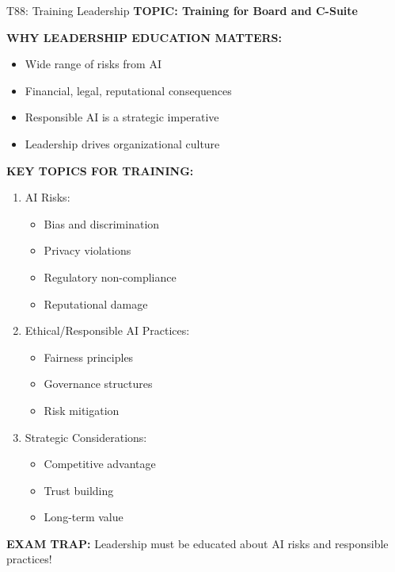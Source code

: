 \documentclass[8pt]{beamer}
\begin{document}
	\begin{frame}{T88: Training Leadership}
		\fontsize{6.5}{7.5}\selectfont
		\textbf{TOPIC: Training for Board and C-Suite}
		
		\vspace{0.1cm}
		\textbf{WHY LEADERSHIP EDUCATION MATTERS:}
		\begin{itemize}
			\item Wide range of risks from AI
			\item Financial, legal, reputational consequences
			\item Responsible AI is a strategic imperative
			\item Leadership drives organizational culture
		\end{itemize}
		
		\vspace{0.1cm}
		\textbf{KEY TOPICS FOR TRAINING:}
		\begin{enumerate}
			\item \textcolor{myblue}{AI Risks:}
			\begin{itemize}
				\item Bias and discrimination
				\item Privacy violations
				\item Regulatory non-compliance
				\item Reputational damage
			\end{itemize}
			\item \textcolor{myblue}{Ethical/Responsible AI Practices:}
			\begin{itemize}
				\item Fairness principles
				\item Governance structures
				\item Risk mitigation
			\end{itemize}
			\item \textcolor{myblue}{Strategic Considerations:}
			\begin{itemize}
				\item Competitive advantage
				\item Trust building
				\item Long-term value
			\end{itemize}
		\end{enumerate}
		
		\textcolor{myred}{\textbf{EXAM TRAP:}} Leadership must be \textcolor{myblue}{educated about AI risks and responsible practices}!
	\end{frame}
	
\end{document}

